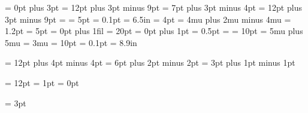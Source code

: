 \abovedisplayshortskip =   0pt plus 3pt
\abovedisplayskip      =  12pt plus 3pt minus 9pt
\belowdisplayshortskip =   7pt plus 3pt minus 4pt
\belowdisplayskip      =  12pt plus 3pt minus 9pt
\boxmaxdepth           = \maxdimen
\delimitershortfall    =   5pt
\hfuzz                 = 0.1pt
\hsize                 = 6.5in
\maxdepth              =   4pt
\medmuskip             =   4mu plus 2mu minus 4mu
\nulldelimiterspace    = 1.2pt
\overfullrule          =   5pt
\parfillskip           =   0pt plus 1fil
\parindent             =  20pt
\parskip               =   0pt plus 1pt
\scriptspace           = 0.5pt
\splitmaxdepth         = \maxdimen
\splittopskip          =  10pt
\thickmuskip           =   5mu plus 5mu
\thinmuskip            =   3mu
\topskip               =  10pt
\vfuzz                 = 0.1pt
\vsize                 = 8.9in


\newskip  \bigskipamount          \bigskipamount       = 12pt plus 4pt minus 4pt
\newskip  \medskipamount          \medskipamount       =  6pt plus 2pt minus 2pt
\newskip  \smallskipamount        \smallskipamount     =  3pt plus 1pt minus 1pt

\newskip  \normalbaselineskip     \normalbaselineskip  = 12pt
\newskip  \normallineskip         \normallineskip      =  1pt
\newdimen \normallineskiplimit    \normallineskiplimit =  0pt

\newdimen \jot                    \jot                 =  3pt


\def\lq{`}
\def\rq{'}

\def\lbrack{[}
\def\rbrack{]}

\let\endgraf\par
\let\endline\cr

\def\space{ }
\def\empty{}
\def\null {\hbox{}}


